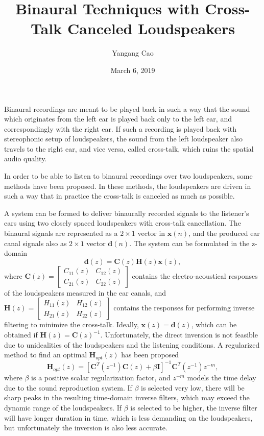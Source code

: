 \documentclass[10pt,a4paper,oneside]{article}
\author{Yangang Cao}
\date{March 6, 2019}
\begin{document}
\title{Binaural Techniques with Cross-Talk Canceled Loudspeakers}
\maketitle 
Binaural recordings are meant to be played back in such a way that the sound which originates from the left ear is played back only to the left ear, and correspondingly with the right ear. If such a recording is played back with stereophonic setup of loudspeakers, the sound from the left loudspeaker also travels to the right ear, and vice versa, called cross-talk, which ruins the spatial audio quality.

In order to be able to listen to binaural recordings over two loudspeakers, some methods have been proposed. In these methods, the loudspeakers are driven in such a way that in practice the cross-talk is canceled as much as possible.

A system can be formed to deliver binaurally recorded signals to the listener’s ears using two closely spaced loudspeakers with cross-talk cancellation. The binaural signals are represented as a $2\times1$ vector in $\mathbf{x}(n)$, and the produced ear canal signals also as $2\times1$ vector $\mathbf{d}(n)$. The system can be formulated in the z-domain
\[
\mathbf{d}(z)=\mathbf{C}(z) \mathbf{H}(z) \mathbf{x}(z),
\]
where $\mathbf{C}(z)=\left[ \begin{array}{ll}{C_{11}(z)} & {C_{12}(z)} \\ {C_{21}(z)} & {C_{22}(z)}\end{array}\right]$ contains the electro-acoustical responses of the loudspeakers measured in the ear canals, and $\mathbf{H}(z)=\left[ \begin{array}{ll}{H_{11}(z)} & {H_{12}(z)} \\ {H_{21}(z)} & {H_{22}(z)}\end{array}\right]$ contains the responses for performing inverse filtering to minimize the cross-talk. Ideally, $\mathbf{x}(z) = \mathbf{d}(z)$, which can be obtained if $\mathbf{H}(z) = \mathbf{C}(z)^{-1}$. Unfortunately, the direct inversion is not feasible due to unidealities of the loudspeakers and the listening conditions. A regularized method to find an optimal $\mathbf{H}_{opt}(z)$ has been proposed
\[
\mathbf{H}_{o p t}(z)=\left[\mathbf{C}^{T}\left(z^{-1}\right) \mathbf{C}(z)+\beta \mathbf{I}\right]^{-1} \mathbf{C}^{T}\left(z^{-1}\right) z^{-m},
\]
where $\beta$ is a positive scalar regularization factor, and $z^{-m}$ models the time delay due to the sound reproduction system. If $\beta$ is selected very low, there will be sharp peaks in the resulting time-domain inverse filters, which may exceed the dynamic range of the loudspeakers. If $\beta$ is selected to be higher, the inverse filter will have longer duration in time, which is less demanding on the loudspeakers, but unfortunately the inversion is also less accurate.
\end{document}
